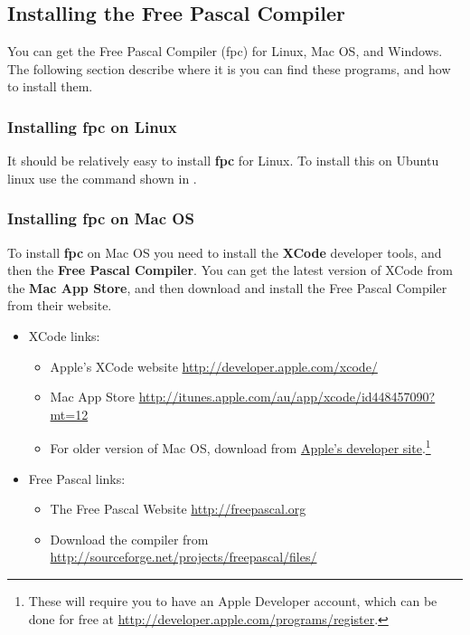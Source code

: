 \subsection{Installing the Free Pascal Compiler} %
\label{sub:installing_fpc}

You can get the Free Pascal Compiler (fpc) for Linux, Mac OS, and Windows. The following section describe where it is you can find these programs, and how to install them.

\subsubsection{Installing fpc on Linux} %
\label{ssub:fpc_linux}

It should be relatively easy to install \textbf{fpc} for Linux. To install this on Ubuntu linux use the command shown in .



\subsubsection{Installing fpc on Mac OS} %
\label{ssub:installing_gcc_on_mac_os}

To install \textbf{fpc} on Mac OS you need to install the \textbf{XCode} developer tools, and then the \textbf{Free Pascal Compiler}. You can get the latest version of XCode from the \textbf{Mac App Store}, and then download and install the Free Pascal Compiler from their website.

\begin{itemize}
  \item XCode links:
  \begin{itemize}
    \item Apple's XCode website \url{http://developer.apple.com/xcode/}
    \item Mac App Store  \url{http://itunes.apple.com/au/app/xcode/id448457090?mt=12}
    \item For older version of Mac OS, download from \href{https://developer.apple.com/downloads/download.action?path=Developer_Tools/xcode_3.2.2_developer_tools_beta_20728/xcode322_2148_developerdvd.dmg}{Apple's developer site}.\footnote{These will require you to have an Apple Developer account, which can be done for free at \url{http://developer.apple.com/programs/register}.}
  \end{itemize}
  \item Free Pascal links:
  \begin{itemize}
    \item The Free Pascal Website \url{http://freepascal.org}
    \item Download the compiler from \url{http://sourceforge.net/projects/freepascal/files/} 
  \end{itemize}
\end{itemize}

